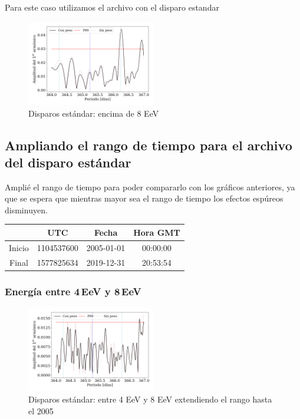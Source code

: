 Para este caso utilizamos el archivo con el disparo estandar

\begin{figure}[H]
	\centering
	\includegraphics[width=0.5\textwidth]{2019_Main_Array_8_EeV_con_vs_sin_peso.png}
	\caption{Disparos estándar: encima de 8 EeV}
	\label{fig:8w}
\end{figure}




\subsection{Ampliando el rango de tiempo para el archivo del disparo estándar}

Amplié el rango de tiempo para poder compararlo con los gráficos anteriores, ya que se espera que mientras mayor sea el rango de tiempo los efectos espúreos disminuyen.

	\begin{table}[H]
	\centering
		\begin{tabular}{c|c|c|c}
	 		& UTC 			& Fecha		 	&  Hora GMT  \\ \hline
	Inicio	& 1104537600	&2005-01-01 	&00:00:00		\\
	Final 	& 1577825634	&2019-12-31 	&20:53:54		\\
		\end{tabular}
	\end{table}


\subsubsection{Energía entre 4\,EeV y 8\,EeV}

\begin{figure}[H]
	\centering
	\includegraphics[width=0.5\textwidth]{2019_Main_Array_4_8_EeV_con_vs_sin_peso_extended.png}
	\caption{Disparos estándar: entre 4 EeV y 8 EeV extendiendo el rango hasta el 2005}
	\label{fig:48w_extended}
\end{figure}

